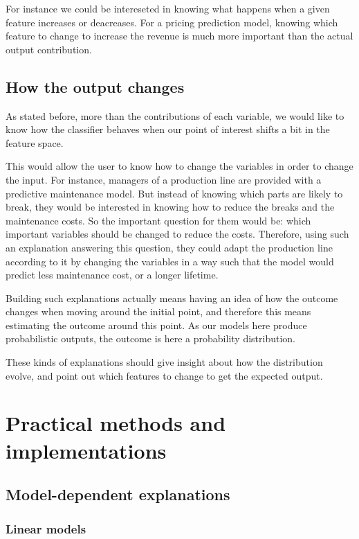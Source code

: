\documentclass[a4paper,11pt]{kth-mag}
\begin{document}
For instance we could be intereseted in knowing what happens when a given feature increases or deacreases. For a pricing prediction model, knowing which feature to change to increase the revenue is much more important than the actual output contribution.

\section{How the output changes}

As stated before, more than the contributions of each variable, we would like to know how the classifier behaves when our point of interest shifts a bit in the feature space.

This would allow the user to know how to change the variables in order to change the input. For instance, managers of a production line are provided with a predictive maintenance model. But instead of knowing which parts are likely to break, they would be interested in knowing how to reduce the breaks and the maintenance costs. So the important question for them would be: which important variables should be changed to reduce the costs. Therefore, using such an explanation answering this question, they could adapt the production line  according to it by changing the variables in a way such that the model would predict less maintenance cost, or a longer lifetime.

Building such explanations actually means having an idea of how the outcome changes when moving around the initial point, and therefore this means estimating the outcome around this point. As our models here produce probabilistic outputs, the outcome is here a probability distribution.

These kinds of explanations should give insight about how the distribution evolve, and point out which features to change to get the expected output.

\chapter{Practical methods and implementations}

\section{Model-dependent explanations}

\subsection{Linear models}
\end{document}
